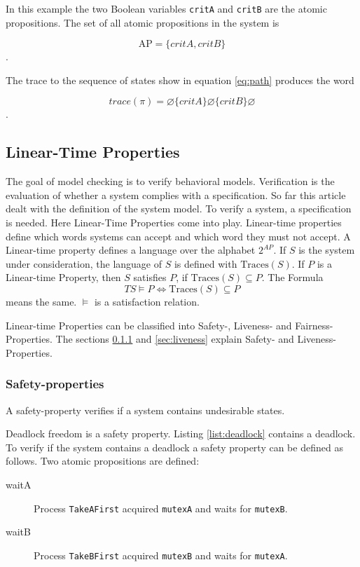 \documentclass[12pt,a4paper,twoside]{article}
\begin{document}
In this example the two Boolean variables \verb|critA| and \verb|critB| are the atomic propositions. The set of all atomic propositions in the system is

\[
\text{AP}=\{critA, critB\}
\].

The trace to the sequence of states show in equation \ref{eq:path} produces the word

\[
trace(\pi) = \varnothing \{critA\} \varnothing \{critB\} \varnothing
\].

\subsection{Linear-Time Properties}
\label{sec:satisfactionrelations}

The goal of model checking is to verify behavioral models. Verification is the evaluation of whether a system complies with a specification. So far this article dealt with the definition of the system model. To verify a system, a specification is needed. Here Linear-Time Properties come into play. Linear-time properties define which words systems can accept and which word they must not accept. A Linear-time property defines a language over the alphabet $2^{AP}$. If $S$ is the system under consideration, the language of $S$ is defined with $\text{Traces}(S)$. If $P$ is a Linear-time Property, then $S$ satisfies $P$, if $\text{Traces}(S) \subseteq P$. The Formula 
\[
TS \models P \iff \text{Traces}(S) \subseteq P 
\]
means the same. $ \models $ is a satisfaction relation\cite[p. 98]{baier08}.

Linear-time Properties can be classified into Safety-, Liveness- and Fair\-ness-Properties. The sections \ref{sec:safety} and \ref{sec:liveness} explain Safety- and Liveness-Properties.

\subsubsection{Safety-properties}
\label{sec:safety}

A safety-property verifies if a system contains undesirable states.

Deadlock freedom is a safety property. Listing \ref{list:deadlock} contains a deadlock. To verify if the system contains a deadlock a safety property can be defined as follows. Two atomic propositions are defined:
\begin{description}
\item[waitA] Process \texttt{TakeAFirst} acquired \texttt{mutexA} and waits for \texttt{mutexB}.
\item[waitB] Process \texttt{TakeBFirst} acquired \texttt{mutexB} and waits for \texttt{mutexA}.
\end{description}
\end{document}
